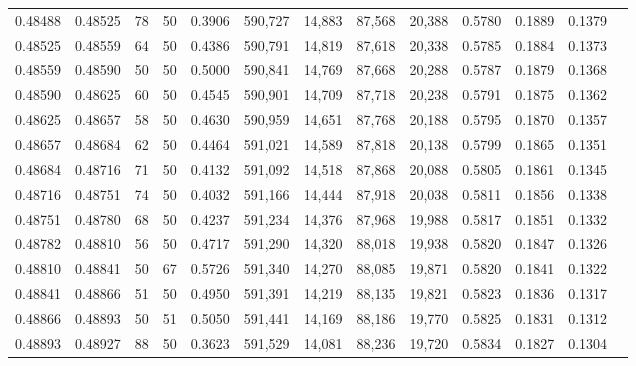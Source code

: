 \begin{tabular}{rrrrrrrrrrrrr}
0.48488 & 0.48525 &    78 &  50 &                                     0.3906 & 590,727 &  14,883 &  87,568 &  20,388 & 0.5780 & 0.1889 & 0.1379 \\
0.48525 & 0.48559 &    64 &  50 &                                     0.4386 & 590,791 &  14,819 &  87,618 &  20,338 & 0.5785 & 0.1884 & 0.1373 \\
0.48559 & 0.48590 &    50 &  50 &                                     0.5000 & 590,841 &  14,769 &  87,668 &  20,288 & 0.5787 & 0.1879 & 0.1368 \\
0.48590 & 0.48625 &    60 &  50 &                                     0.4545 & 590,901 &  14,709 &  87,718 &  20,238 & 0.5791 & 0.1875 & 0.1362 \\
0.48625 & 0.48657 &    58 &  50 &                                     0.4630 & 590,959 &  14,651 &  87,768 &  20,188 & 0.5795 & 0.1870 & 0.1357 \\
0.48657 & 0.48684 &    62 &  50 &                                     0.4464 & 591,021 &  14,589 &  87,818 &  20,138 & 0.5799 & 0.1865 & 0.1351 \\
0.48684 & 0.48716 &    71 &  50 &                                     0.4132 & 591,092 &  14,518 &  87,868 &  20,088 & 0.5805 & 0.1861 & 0.1345 \\
0.48716 & 0.48751 &    74 &  50 &                                     0.4032 & 591,166 &  14,444 &  87,918 &  20,038 & 0.5811 & 0.1856 & 0.1338 \\
0.48751 & 0.48780 &    68 &  50 &                                     0.4237 & 591,234 &  14,376 &  87,968 &  19,988 & 0.5817 & 0.1851 & 0.1332 \\
0.48782 & 0.48810 &    56 &  50 &                                     0.4717 & 591,290 &  14,320 &  88,018 &  19,938 & 0.5820 & 0.1847 & 0.1326 \\
0.48810 & 0.48841 &    50 &  67 &                                     0.5726 & 591,340 &  14,270 &  88,085 &  19,871 & 0.5820 & 0.1841 & 0.1322 \\
0.48841 & 0.48866 &    51 &  50 &                                     0.4950 & 591,391 &  14,219 &  88,135 &  19,821 & 0.5823 & 0.1836 & 0.1317 \\
0.48866 & 0.48893 &    50 &  51 &                                     0.5050 & 591,441 &  14,169 &  88,186 &  19,770 & 0.5825 & 0.1831 & 0.1312 \\
0.48893 & 0.48927 &    88 &  50 &                                     0.3623 & 591,529 &  14,081 &  88,236 &  19,720 & 0.5834 & 0.1827 & 0.1304 \\

\end{tabular}
